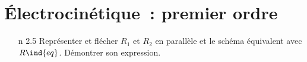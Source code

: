 \documentclass[a4paper, 10pt, final, garamond]{book}
\begin{document}
\setcounter{chapter}{3}


\chapter{Électrocinétique~: premier ordre}

\begin{enumerate}[label=\sqenumi, leftmargin=10pt]
	\item[n]{2.5} %
	      Représenter et flécher $R_1$ et $R_2$ en parallèle et le schéma équivalent
	      avec $R\ind{eq}$. Démontrer son expression.
	      \smallbreak
	      \begin{isd}[lefthand ratio=.3]
		      \vspace{-15pt}
		      \begin{center}
\end{center}
\end{isd}
\end{enumerate}
\end{document}
